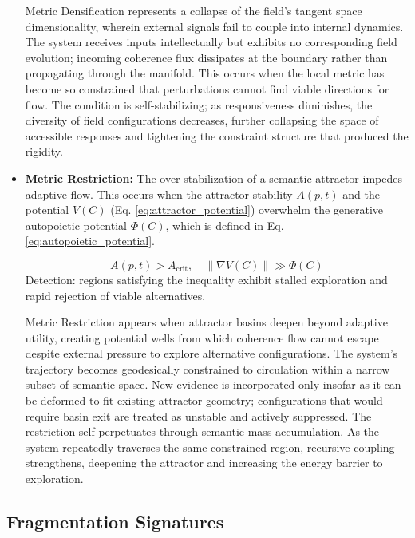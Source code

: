 \begin{itemize}
    Metric Densification represents a collapse of the field's tangent space dimensionality, wherein external signals fail to couple into internal dynamics. The system receives inputs intellectually but exhibits no corresponding field evolution; incoming coherence flux dissipates at the boundary rather than propagating through the manifold. This occurs when the local metric has become so constrained that perturbations cannot find viable directions for flow. The condition is self-stabilizing; as responsiveness diminishes, the diversity of field configurations decreases, further collapsing the space of accessible responses and tightening the constraint structure that produced the rigidity.
    
    \item \textbf{Metric Restriction:} The over-stabilization of a semantic attractor impedes adaptive flow. This occurs when the attractor stability \(A(p,t)\) and the potential \(V(C)\) (Eq. \ref{eq:attractor_potential}) overwhelm the generative autopoietic potential \(\Phi(C)\), which is defined in Eq. \ref{eq:autopoietic_potential}.

    \begin{equation}
    A(p,t) > A_{\text{crit}}, \quad \|\nabla V(C)\| \gg \Phi(C)
    \end{equation}
    Detection: regions satisfying the inequality exhibit stalled exploration and rapid rejection of viable alternatives.

    Metric Restriction appears when attractor basins deepen beyond adaptive utility, creating potential wells from which coherence flow cannot escape despite external pressure to explore alternative configurations. The system's trajectory becomes geodesically constrained to circulation within a narrow subset of semantic space. New evidence is incorporated only insofar as it can be deformed to fit existing attractor geometry; configurations that would require basin exit are treated as unstable and actively suppressed. The restriction self-perpetuates through semantic mass accumulation. As the system repeatedly traverses the same constrained region, recursive coupling strengthens, deepening the attractor and increasing the energy barrier to exploration.

\end{itemize}


\subsection{Fragmentation Signatures}
\label{16.2.2:fragmentation_signatures}

